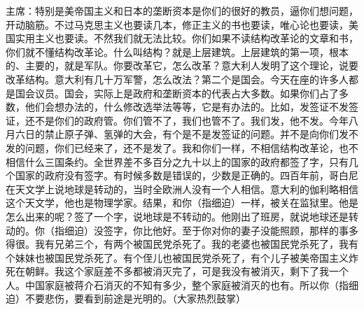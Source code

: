 主席：特别是美帝国主义和日本的垄断资本是你们的很好的教员，逼你们想问题，开动脑筋。不过马克思主义也要读几本，修正主义的书也要读，唯心论也要读，美国实用主义也要读。不然我们就无法比较。你们如果不读结构改革论的文章和书，你们就不懂结构改革论。什么叫结构？就是上层建筑。上层建筑的第一项，根本的、主要的，就是军队。你要改革它，怎么改革？意大利人发明了这个理论，说要改革结构。意大利有几十万军警，怎么改法？第二个是国会。今天在座的许多人都是国会议员。国会，实际上是政府和垄断资本的代表占大多数。如果你们占了多数，他们会想办法的，什么修改选举法等等，它是有办法的。比如，发签证不发签证，还不是你们的政府管。你们管不了，我们也管不了。我们发，他不发。今年八月六日的禁止原子弹、氢弹的大会，有个是不是发签证的问题。并不是向你们发不发的问题，你们已经来了，还不是发了。我和你们一样，不相信结构改革论，也不相信什么三国条约。全世界差不多百分之九十以上的国家的政府都签了字，只有几个国家的政府没有签字。有时候多数是错误的，少数是正确的。四百年前，哥白尼在天文学上说地球是转动的，当时全欧洲人没有一个人相信。意大利的伽利略相信这个天文学，他也是物理学家。结果，和你（指细迫）一样，被关在监狱里。他是怎么出来的呢？签了一个字，说地球是不转动的。他刚出了班房，就说地球还是转动的。你（指细迫）没签字，你比他好。至于你对你的妻子没能照顾，那样的事多得很。我有兄弟三个，有两个被国民党杀死了。我的老婆也被国民党杀死了，我有个妹妹也被国民党杀死了。有个侄儿也被国民党杀死了，有个儿子被美帝国主义炸死在朝鲜。我这个家庭差不多都被消灭完了，可是我没有被消灭，剩下了我一个人。中国家庭被蒋介石消灭的不知有多少，整个家庭被消灭的也有。所以你（指细迫）不要悲伤，要看到前途是光明的。（大家热烈鼓掌）


